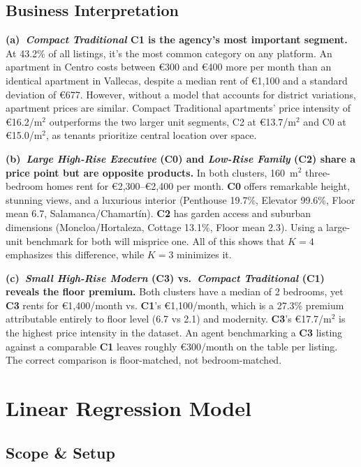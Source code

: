 \documentclass[10pt,a4paper,twocolumn]{article}
\newcommand{\cluster}[1]{\textbf{C#1}}
\newcommand{\seg}[1]{\textit{#1}}          %
\begin{document}
\subsection{Business Interpretation}

\textbf{(a)~\seg{Compact Traditional} \cluster{1} is the agency's most important segment.} At 43.2\% of all listings, it's the most common category on any platform. An apartment in Centro costs between €300 and €400 more per month than an identical apartment in Vallecas, despite a median rent of €1,100 and a standard deviation of €677. However, without a model that accounts for district variations, apartment prices are similar. Compact Traditional apartments' price intensity of €16.2/m$^{2}$ outperforms the two larger unit segments, C2 at €13.7/m$^{2}$ and C0 at €15.0/m$^{2}$, as tenants prioritize central location over space. 

\textbf{(b)~\seg{Large High-Rise Executive} (\cluster{0}) and \seg{Low-Rise Family} (\cluster{2}) share a price point but are opposite products.} In both clusters, 160~m$^{2}$ three-bedroom homes rent for €2,300--€2,400 per month. \cluster{0} offers remarkable height, stunning views, and a luxurious interior (Penthouse 19.7\%, Elevator 99.6\%, Floor mean 6.7, Salamanca/Chamartín). \cluster{2} has garden access and suburban dimensions (Moncloa/Hortaleza, Cottage 13.1\%, Floor mean 2.3). Using a large-unit benchmark for both will misprice one. All of this shows that $K\!=\!4$ emphasizes this difference, while $K\!=\!3$ minimizes it. 

\textbf{(c)~\seg{Small High-Rise Modern} (\cluster{3}) vs.\ \seg{Compact Traditional} (\cluster{1}) reveals the floor premium.} Both clusters have a median of 2 bedrooms, yet \cluster{3} rents for €1,400/month vs. \cluster{1}'s €1,100/month, which is a 27.3\% premium attributable entirely to floor level (6.7 vs 2.1) and modernity. \cluster{3}'s €17.7/m$^{2}$ is the highest price intensity in the dataset. An agent benchmarking a \cluster{3} listing against a comparable \cluster{1} leaves roughly €300/month on the table per listing. The correct comparison is floor-matched, not bedroom-matched.

\section{Linear Regression Model}

\subsection{Scope \& Setup}
\end{document}
